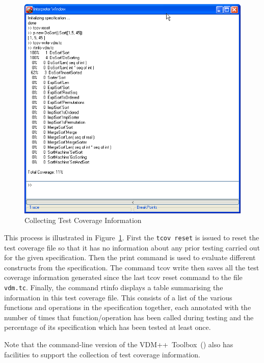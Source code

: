 \documentclass[\pformat,12pt]{article}
\newcommand{\vdmslpp}{VDM++}
\newcommand{\Toolbox}{Toolbox}
\newcommand{\guicmd}[1]{{\sf #1}}
\begin{document}
\begin{figure}[tbh]
\begin{center}
\includegraphics[width=12.5cm]{testCov-ppENG.png}
\caption{Collecting Test Coverage Information}
\label{fig:guitcov}
\end{center}
\end{figure}

This process is illustrated in Figure~\ref{fig:guitcov}. First the 
{\tt tcov reset} is issued to
reset the test coverage file so that it has no information about any
prior testing carried out for the given specification. Then the
\guicmd{print} command is used to evaluate different constructs from
the specification. The command \guicmd{tcov write} then saves all the test coverage information
generated since the last \guicmd{tcov reset} command to the file
\texttt{vdm.tc}. Finally, the command \guicmd{rtinfo} 
displays a table summarising the information in
this test coverage 
file. This consists of a list of the various functions and operations
in the specification together, each annotated with the number of times
that function/operation has been called during testing and the
percentage of its specification which has been tested at least once.

Note that the command-line version of the \vdmslpp\ \Toolbox\ 
() also
has facilities to support the collection of test coverage
information.
\end{document}
